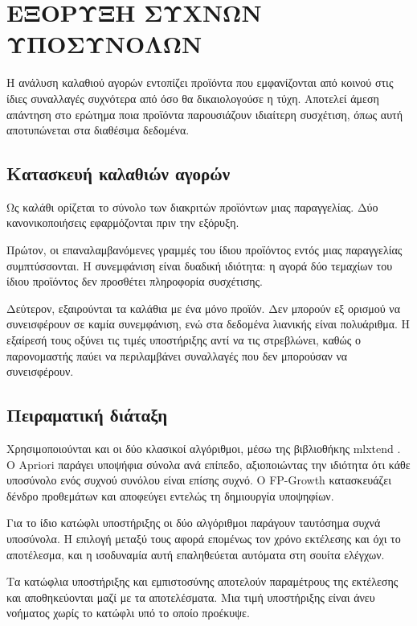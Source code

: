 \chapter{ΕΞΟΡΥΞΗ ΣΥΧΝΩΝ ΥΠΟΣΥΝΟΛΩΝ}
\label{chap:frequent-itemsets}

Η ανάλυση καλαθιού αγορών εντοπίζει προϊόντα που εμφανίζονται από κοινού στις
ίδιες συναλλαγές συχνότερα από όσο θα δικαιολογούσε η τύχη. Αποτελεί άμεση
απάντηση στο ερώτημα ποια προϊόντα παρουσιάζουν ιδιαίτερη συσχέτιση, όπως
αυτή αποτυπώνεται στα διαθέσιμα δεδομένα.

\section{Κατασκευή καλαθιών αγορών}

Ως καλάθι ορίζεται το σύνολο των διακριτών προϊόντων μιας παραγγελίας. Δύο
κανονικοποιήσεις εφαρμόζονται πριν την εξόρυξη.

Πρώτον, οι επαναλαμβανόμενες γραμμές του ίδιου προϊόντος εντός μιας
παραγγελίας συμπτύσσονται. Η συνεμφάνιση είναι δυαδική ιδιότητα: η αγορά δύο
τεμαχίων του ίδιου προϊόντος δεν προσθέτει πληροφορία συσχέτισης.

Δεύτερον, εξαιρούνται τα καλάθια με ένα μόνο προϊόν. Δεν μπορούν εξ ορισμού να
συνεισφέρουν σε καμία συνεμφάνιση, ενώ στα δεδομένα λιανικής είναι πολυάριθμα.
Η εξαίρεσή τους οξύνει τις τιμές υποστήριξης αντί να τις στρεβλώνει, καθώς ο
παρονομαστής παύει να περιλαμβάνει συναλλαγές που δεν μπορούσαν να
συνεισφέρουν.

\section{Πειραματική διάταξη}

Χρησιμοποιούνται και οι δύο κλασικοί αλγόριθμοι, μέσω της βιβλιοθήκης
\textenglish{mlxtend} \cite{raschka2018mlxtend}. Ο \textenglish{Apriori}
\cite{agrawal1994fast} παράγει υποψήφια σύνολα ανά επίπεδο,
αξιοποιώντας την ιδιότητα ότι κάθε υποσύνολο ενός συχνού συνόλου είναι επίσης
συχνό. Ο \textenglish{FP-Growth} \cite{han2000mining} κατασκευάζει
δένδρο προθεμάτων και αποφεύγει εντελώς τη δημιουργία υποψηφίων.

Για το ίδιο κατώφλι υποστήριξης οι δύο αλγόριθμοι παράγουν ταυτόσημα συχνά
υποσύνολα. Η επιλογή μεταξύ τους αφορά επομένως τον χρόνο εκτέλεσης και όχι το
αποτέλεσμα, και η ισοδυναμία αυτή επαληθεύεται αυτόματα στη σουίτα ελέγχων.

Τα κατώφλια υποστήριξης και εμπιστοσύνης αποτελούν παραμέτρους της εκτέλεσης
και αποθηκεύονται μαζί με τα αποτελέσματα. Μια τιμή υποστήριξης είναι άνευ
νοήματος χωρίς το κατώφλι υπό το οποίο προέκυψε.

